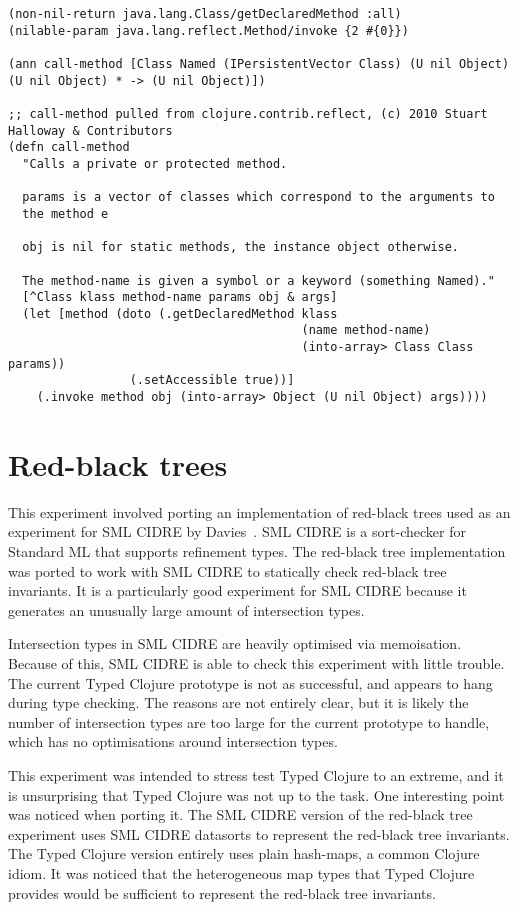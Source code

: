 \begin{lstlisting}[caption=Type Annotated code for call-method, label=lst:callmethodfinal]
(non-nil-return java.lang.Class/getDeclaredMethod :all)
(nilable-param java.lang.reflect.Method/invoke {2 #{0}})

(ann call-method [Class Named (IPersistentVector Class) (U nil Object) (U nil Object) * -> (U nil Object)])

;; call-method pulled from clojure.contrib.reflect, (c) 2010 Stuart Halloway & Contributors
(defn call-method
  "Calls a private or protected method.

  params is a vector of classes which correspond to the arguments to
  the method e

  obj is nil for static methods, the instance object otherwise.

  The method-name is given a symbol or a keyword (something Named)."
  [^Class klass method-name params obj & args]
  (let [method (doto (.getDeclaredMethod klass 
                                         (name method-name)
                                         (into-array> Class Class params))
                 (.setAccessible true))]
    (.invoke method obj (into-array> Object (U nil Object) args))))
\end{lstlisting}

\section{Red-black trees}

This experiment involved porting an implementation of red-black trees
used as an experiment for SML CIDRE by Davies~\cite{Dav05}.
SML CIDRE is a sort-checker for Standard ML that supports refinement
types.
The red-black tree implementation was ported to work with SML CIDRE
to statically check red-black tree invariants.
It is a particularly good experiment for SML CIDRE because it generates an unusually large
amount of intersection types.

Intersection types in SML CIDRE are heavily optimised via memoisation.
Because of this, SML CIDRE is able to check this experiment with little trouble.
The current Typed Clojure prototype is not as successful, and appears to hang
during type checking.
The reasons are not entirely clear, but it is likely the number of intersection types
are too large for the current prototype to handle, which has no optimisations
around intersection types.

This experiment was intended to stress test Typed Clojure to an extreme, and
it is unsurprising that Typed Clojure was not up to the task.
One interesting point was noticed when porting it.
The SML CIDRE version of the red-black tree experiment
uses SML CIDRE datasorts to represent the red-black tree invariants.
The Typed Clojure version entirely uses plain hash-maps, a common Clojure idiom.
It was noticed that the heterogeneous map types that Typed Clojure provides would be sufficient to
represent the red-black tree invariants.

